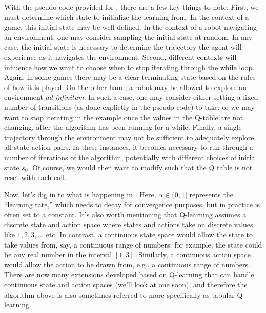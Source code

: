 With the pseudo-code provided for , there are a few
key things to note. First, we must determine which state to initialize the
learning from. In the context of a game, this initial state may be well defined.
In the context of a robot navigating an environment, one may consider
sampling the initial state at random. In any case, the initial state is necessary
to determine the trajectory the agent will experience as it navigates the environment.
Second, different contexts will influence how we want to choose when to stop
iterating through the while loop. Again, in some games there may be a clear
terminating state based on the rules of how it is played. On the other hand,
a robot may be allowed to explore an environment \emph{ad infinitum}.
In such a case, one may consider either setting a fixed number of transitions (as done explictly in the pseudo-code) to take; or we may want to stop iterating in the example once the values in the Q-table are not changing, after the algorithm has been running for a while. Finally, a single trajectory through the environment may not be sufficient to adequately explore all state-action pairs. In these instances, it becomes necessary to run
through a number of iterations of the  algorithm, potentially
with different choices of initial state $s_0$. Of course, we would then want to modify  such
that the Q table is not reset with each call.

Now, let's dig in to what is happening in .
Here, $\alpha\in (0,1]$ represents the ``learning rate,'' which needs to decay
for convergence purposes, but in practice is often set to a
constant. It's also worth mentioning that Q-learning assumes a
discrete state and action space where states and actions take on
discrete values like $1,2,3,\dots$ etc. In contrast, a continuous
state space would allow the state to take values from, say, a
continuous range of numbers; for example, the state could be any real
number in the interval $[1,3]$. Similarly, a continuous action space
would allow the action to be drawn from, e.g., a continuous range of
numbers. There are now many extensions developed based on Q-learning
that can handle continuous state and action spaces (we'll look at one
soon), and therefore the algorithm above is also sometimes referred to
more  specifically as tabular Q-learning.

